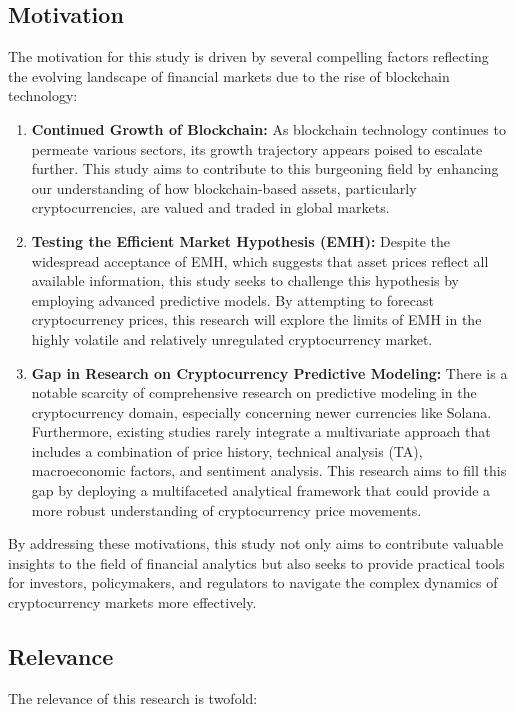 \subsection{Motivation}
The motivation for this study is driven by several compelling factors reflecting the evolving landscape of financial markets due to the rise of 
blockchain technology:

\begin{enumerate}
\item \textbf{Continued Growth of Blockchain:} As blockchain technology continues to permeate various sectors, its growth trajectory appears poised to escalate 
further. This study aims to contribute to this burgeoning field by enhancing our understanding of how blockchain-based assets, particularly 
cryptocurrencies, are valued and traded in global markets.

\item \textbf{Testing the Efficient Market Hypothesis (EMH):} Despite the widespread acceptance of EMH, which suggests that asset prices reflect all available 
information, this study seeks to challenge this hypothesis by employing advanced predictive models. By attempting to forecast cryptocurrency prices, 
this research will explore the limits of EMH in the highly volatile and relatively unregulated cryptocurrency market.

\item \textbf{Gap in Research on Cryptocurrency Predictive Modeling:} There is a notable scarcity of comprehensive research on predictive modeling in the 
cryptocurrency domain, especially concerning newer currencies like Solana. Furthermore, existing studies rarely integrate a multivariate approach 
that includes a combination of price history, technical analysis (TA), macroeconomic factors, and sentiment analysis. This research aims to fill 
this gap by deploying a multifaceted analytical framework that could provide a more robust understanding of cryptocurrency price movements.
\end{enumerate}

By addressing these motivations, this study not only aims to contribute valuable insights to the field of financial analytics but also seeks to 
provide practical tools for investors, policymakers, and regulators to navigate the complex dynamics of cryptocurrency markets more effectively.

\subsection{Relevance}
The relevance of this research is twofold:


